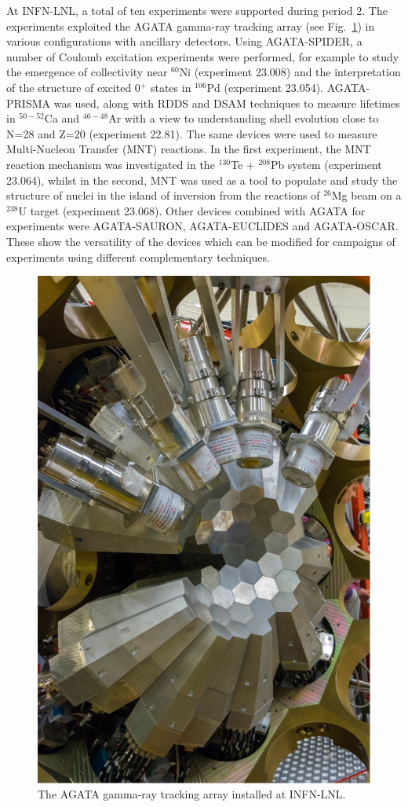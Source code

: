 At INFN-LNL, a total of ten experiments were supported during period 2. The experiments exploited the AGATA gamma-ray tracking array (see Fig.~\ref{fig:AGATA_LNL}) in various configurations with ancillary detectors. Using AGATA-SPIDER, a number of Coulomb excitation experiments were performed, for example to study the emergence of collectivity near $^{60}$Ni (experiment 23.008) and the interpretation of the structure of excited 0$^+$ states in $^{106}$Pd (experiment 23.054). AGATA-PRISMA was used, along with RDDS and DSAM techniques to measure lifetimes in $^{50-52}$Ca and $^{46-48}$Ar with a view to understanding shell evolution close to N=28 and Z=20 (experiment 22.81). The same devices were used to measure Multi-Nucleon Transfer (MNT) reactions. In the first experiment, the MNT reaction mechanism was investigated in the $^{130}$Te + $^{208}$Pb system (experiment 23.064), whilst in the second, MNT was used as a tool to populate and study the structure of nuclei in the island of inversion from the reactions of $^{26}$Mg beam on a $^{238}$U target (experiment 23.068). Other devices combined with AGATA for experiments were AGATA-SAURON, AGATA-EUCLIDES and AGATA-OSCAR. These show the versatility of the devices which can be modified for campaigns of experiments using different complementary techniques.

\begin{figure}[!h]
    \centering
    \includegraphics[width=0.6\linewidth]{graphics/AGATA_LNL.png}
    \caption{The AGATA gamma-ray tracking array installed at INFN-LNL.}
    \label{fig:AGATA_LNL}
\end{figure}

